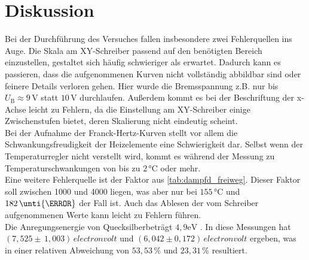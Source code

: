 \section{Diskussion}

Bei der Durchführung des Versuches fallen insbesondere zwei Fehlerquellen ins Auge.
Die Skala am XY-Schreiber passend auf den benötigten Bereich einzustellen, gestaltet sich häufig schwieriger als erwartet.
Dadurch kann es passieren, dass die aufgenommenen Kurven nicht vollständig abbildbar sind oder feinere Details verloren gehen.
Hier wurde die Bremsspannung z.B. nur bis $U_\text{B} \approx 9 \,\unit{\volt}$ statt $10 \,\unit{\volt}$ durchlaufen.
Außerdem kommt es bei der Beschriftung der x-Achse leicht zu Fehlern, da die Einstellung am XY-Schreiber einige Zwischenstufen bietet, deren Skalierung nicht eindeutig scheint. \\

Bei der Aufnahme der Franck-Hertz-Kurven stellt vor allem die Schwankungsfreudigkeit der Heizelemente eine Schwierigkeit dar.
Selbst wenn der Temperaturregler nicht verstellt wird, kommt es während der Messung zu Temperaturschwankungen von bis zu $2 \,\unit{\celsius}$ oder mehr. \\

Eine weitere Fehlerquelle ist der Faktor aus \autoref{tab:dampfd_freiweg}. Dieser Faktor soll zwischen 1000 und 4000 liegen, was aber nur bei $155 \, \unit{\celsius}$ und $182 \, \unti{\celsius}$ der Fall ist.
Auch das Ablesen der vom Schreiber aufgenommenen Werte kann leicht zu Fehlern führen. \\

Die Anregungsenergie von Quecksilberbeträgt $4,9 \unit{\electronvolt}$  \cite{ap09} . In diese Messungen hat $\left( 7,525 \pm \, 1,003\right) \, \unit{electronvolt}$ und  $ \left(6,042 \pm 0,172 \right)\, \unit{electronvolt}$ ergeben, was in einer relativen Abweichung von $53,53 \, \%$ und $23,31 \, \%$ resultiert.
